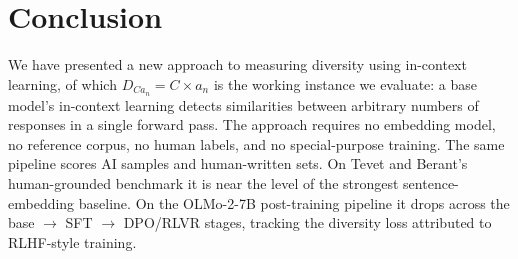 \section{Conclusion}\label{sec:conclusion}

We have presented a new approach to measuring diversity using in-context learning, of which $D_{Ca_n} = C \times a_n$ is the working instance we evaluate: a base model's in-context learning detects similarities between arbitrary numbers of responses in a single forward pass.
The approach requires no embedding model, no reference corpus, no human labels, and no special-purpose training.
The same pipeline scores AI samples and human-written sets.
On Tevet and Berant's human-grounded benchmark it is near the level of the strongest sentence-embedding baseline.
On the OLMo-2-7B post-training pipeline it drops across the base $\to$ SFT $\to$ DPO/RLVR stages, tracking the diversity loss attributed to RLHF-style training.
